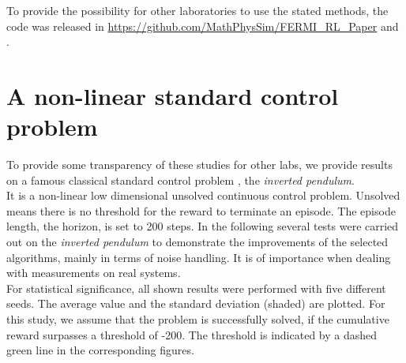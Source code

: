 \documentclass[
reprint,
amsmath,amssymb,amsfonts,clevref,
aps,
prstab,
]{revtex4-2}
\begin{document}
 To provide the possibility for other laboratories to use the stated methods, the code was released in \url{https://github.com/MathPhysSim/FERMI_RL_Paper} and \cite{Hirlaender2020}.
 \vfill
 \newpage
 \vfill
 
 
 
 
 
  \newpage
	\appendix
	\section{A non-linear standard control problem}
	To provide some transparency of these studies for other labs, we provide results on a famous classical standard control problem \cite{Furutaa}, the \emph{inverted pendulum}.\\
	 It is a non-linear low dimensional unsolved continuous control problem. Unsolved means there is no threshold for the reward to terminate an episode. The episode length, the horizon, is set to 200 steps. In the following several tests were carried out on the \emph{inverted pendulum} to demonstrate the improvements of the selected algorithms, mainly in terms of noise handling. It is of importance when dealing with measurements on real systems.\\
	 For statistical significance, all shown results were performed with five different seeds. The average value and the standard deviation (shaded) are plotted. For this study, we assume that the problem is successfully solved, if the cumulative reward surpasses a threshold of -200. The threshold is indicated by a dashed green line in the corresponding figures.
	
\end{document}
